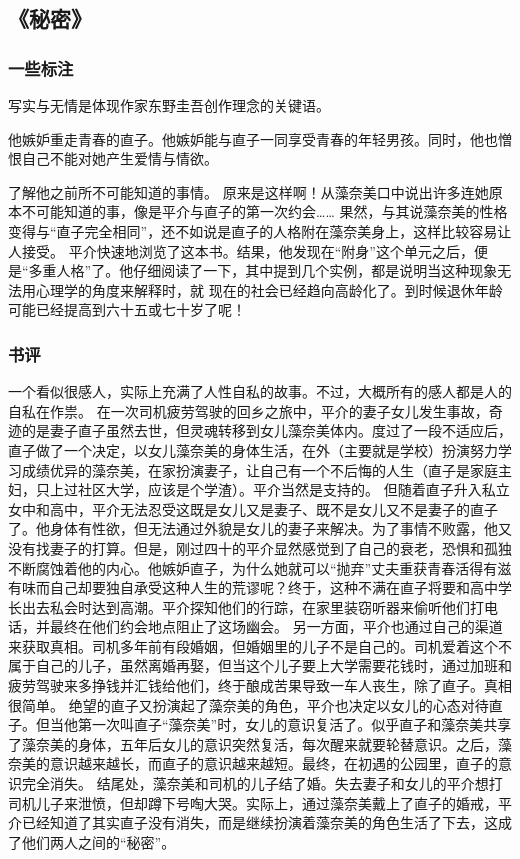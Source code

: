 \subsection{《秘密》}
\subsubsection{一些标注}
\begin{itemize*}
	\item 写实与无情是体现作家东野圭吾创作理念的关键语。
	\item 他嫉妒重走青春的直子。他嫉妒能与直子一同享受青春的年轻男孩。同时，他也憎恨自己不能对她产生爱情与情欲。
	\item 了解他之前所不可能知道的事情。 原来是这样啊！从藻奈美口中说出许多连她原本不可能知道的事，像是平介与直子的第一次约会…… 果然，与其说藻奈美的性格变得与“直子完全相同”，还不如说是直子的人格附在藻奈美身上，这样比较容易让人接受。 平介快速地浏览了这本书。结果，他发现在“附身”这个单元之后，便是“多重人格”了。他仔细阅读了一下，其中提到几个实例，都是说明当这种现象无法用心理学的角度来解释时，就
现在的社会已经趋向高龄化了。到时候退休年龄可能已经提高到六十五或七十岁了呢！
\end{itemize*}

\subsubsection{书评}
一个看似很感人，实际上充满了人性自私的故事。不过，大概所有的感人都是人的自私在作祟。 
在一次司机疲劳驾驶的回乡之旅中，平介的妻子女儿发生事故，奇迹的是妻子直子虽然去世，但灵魂转移到女儿藻奈美体内。度过了一段不适应后，直子做了一个决定，以女儿藻奈美的身体生活，在外（主要就是学校）扮演努力学习成绩优异的藻奈美，在家扮演妻子，让自己有一个不后悔的人生（直子是家庭主妇，只上过社区大学，应该是个学渣）。平介当然是支持的。 
但随着直子升入私立女中和高中，平介无法忍受这既是女儿又是妻子、既不是女儿又不是妻子的直子了。他身体有性欲，但无法通过外貌是女儿的妻子来解决。为了事情不败露，他又没有找妻子的打算。但是，刚过四十的平介显然感觉到了自己的衰老，恐惧和孤独不断腐蚀着他的内心。他嫉妒直子，为什么她就可以“抛弃”丈夫重获青春活得有滋有味而自己却要独自承受这种人生的荒谬呢？终于，这种不满在直子将要和高中学长出去私会时达到高潮。平介探知他们的行踪，在家里装窃听器来偷听他们打电话，并最终在他们约会地点阻止了这场幽会。 
另一方面，平介也通过自己的渠道来获取真相。司机多年前有段婚姻，但婚姻里的儿子不是自己的。司机爱着这个不属于自己的儿子，虽然离婚再娶，但当这个儿子要上大学需要花钱时，通过加班和疲劳驾驶来多挣钱并汇钱给他们，终于酿成苦果导致一车人丧生，除了直子。真相很简单。 
绝望的直子又扮演起了藻奈美的角色，平介也决定以女儿的心态对待直子。但当他第一次叫直子“藻奈美”时，女儿的意识复活了。似乎直子和藻奈美共享了藻奈美的身体，五年后女儿的意识突然复活，每次醒来就要轮替意识。之后，藻奈美的意识越来越长，而直子的意识越来越短。最终，在初遇的公园里，直子的意识完全消失。 
结尾处，藻奈美和司机的儿子结了婚。失去妻子和女儿的平介想打司机儿子来泄愤，但却蹲下号啕大哭。实际上，通过藻奈美戴上了直子的婚戒，平介已经知道了其实直子没有消失，而是继续扮演着藻奈美的角色生活了下去，这成了他们两人之间的“秘密”。

